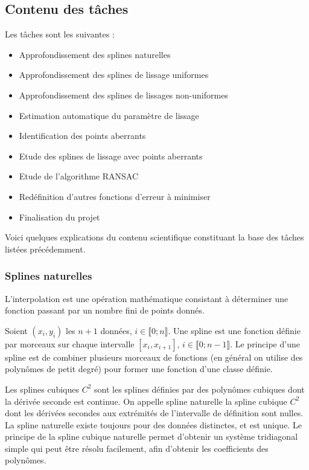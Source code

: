 \documentclass[a4paper,12pt]{article} %
\begin{document}
	\subsection{Contenu des tâches}
	Les tâches sont les suivantes :
\begin{itemize}
\item Approfondissement des splines naturelles
\item Approfondissement des splines de lissage uniformes
\item Approfondissement des splines de lissages non-uniformes
\item Estimation automatique du paramètre de lissage
\item Identification des points aberrants
\item Etude des splines de lissage avec points aberrants
\item Etude de l'algorithme RANSAC
\item Redéfinition d'autres fonctions d'erreur à minimiser
\item Finalisation du projet
\end{itemize}
Voici quelques explications du contenu scientifique constituant la base des tâches listées précédemment.

\subsubsection*{Splines naturelles}
L’interpolation est une opération mathématique consistant à déterminer une fonction passant par un nombre fini de points donnés.

Soient $(x_i,y_i)$ les $n+1$ données, $i\in\llbracket 0; n \rrbracket$.
Une spline est une fonction définie par morceaux sur chaque intervalle $[x_i, x_{i+1}]$, $i\in\llbracket 0; n-1 \rrbracket$.
Le principe d'une spline est de combiner plusieurs morceaux de fonctions (en général on utilise des polynômes de petit degré) pour former une fonction d'une classe définie.

\newpage
Les splines cubiques $C^2$ sont les splines définies par des polynômes cubiques dont la dérivée seconde est continue. On appelle spline naturelle la spline cubique $C^2$ dont les dérivées secondes aux extrémités de l'intervalle de définition sont nulles. La spline naturelle existe toujours pour des données distinctes, et est unique. Le principe de la spline cubique naturelle permet d'obtenir un système tridiagonal simple qui peut être résolu facilement, afin d'obtenir les coefficients des polynômes.
\end{document}
